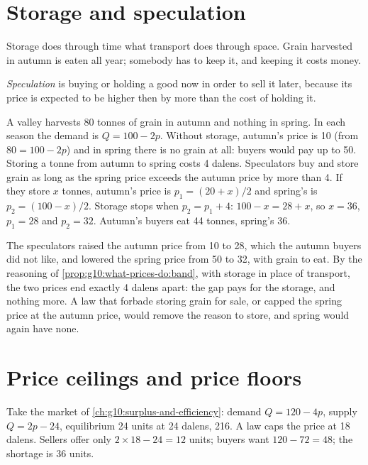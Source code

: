 \section{Storage and speculation}\label{sec:g10:what-prices-do:storage}

Storage does through time what transport does through space. Grain harvested in autumn is eaten all year; somebody has to keep it, and keeping it costs
money.

\begin{definition}[Speculation]\label{def:g10:what-prices-do:speculation}
\emph{Speculation} is buying or holding a good now in order to sell it later, because its price is expected to be higher then by more than
the cost of holding it.
\end{definition}

\begin{example}\label{ex:g10:what-prices-do:seasons}
A valley harvests 80 tonnes of grain in autumn and nothing in spring. In each season the demand is $Q = 100 - 2p$. Without storage, autumn's price is 10 (from $80 =
100 - 2p$) and in spring there is no grain at all: buyers would pay up to 50. Storing a tonne from autumn to spring costs 4 dalens. Speculators buy and store
grain as long as the spring price exceeds the autumn price by more than 4. If they store $x$ tonnes, autumn's price is $p_1 = (20 + x)/2$ and spring's is $p_2 =
(100 - x)/2$. Storage stops when $p_2 = p_1 + 4$: $100 - x = 28 + x$, so $x = 36$, $p_1 = 28$ and $p_2 = 32$. Autumn's buyers eat 44 tonnes, spring's 36.
\end{example}

The speculators raised the autumn price from 10 to 28, which the autumn buyers did not like, and lowered the spring price from 50 to 32, with grain to eat. By the
reasoning of \cref{prop:g10:what-prices-do:band}, with storage in place of transport, the two prices end exactly 4 dalens apart: the gap pays for the storage, and
nothing more. A law that forbade storing grain for sale, or capped the spring price at the autumn price, would remove the reason to store, and spring would again
have none.

\section{Price ceilings and price floors}\label{sec:g10:what-prices-do:controls}

Take the market of \cref{ch:g10:surplus-and-efficiency}: demand $Q = 120 - 4p$, supply $Q = 2p - 24$, equilibrium 24 units at 24 dalens,  216. A law
caps the price at 18 dalens. Sellers offer only $2 \times 18 - 24 = 12$ units; buyers want $120 - 72 = 48$; the shortage is 36 units.

